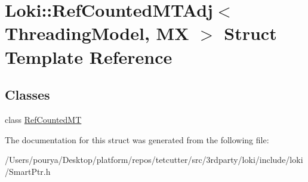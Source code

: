 \hypertarget{structLoki_1_1RefCountedMTAdj}{}\section{Loki\+:\+:Ref\+Counted\+M\+T\+Adj$<$ Threading\+Model, M\+X $>$ Struct Template Reference}
\label{structLoki_1_1RefCountedMTAdj}
\subsection*{Classes}
\begin{DoxyCompactItemize}
\item 
class \hyperlink{classLoki_1_1RefCountedMTAdj_1_1RefCountedMT}{Ref\+Counted\+M\+T}
\end{DoxyCompactItemize}


The documentation for this struct was generated from the following file\+:\begin{DoxyCompactItemize}
\item 
/\+Users/pourya/\+Desktop/platform/repos/tetcutter/src/3rdparty/loki/include/loki/Smart\+Ptr.\+h\end{DoxyCompactItemize}
